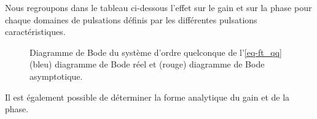 Nous regroupons dans le tableau ci-dessous l'effet sur le gain et sur la phase 
pour chaque domaines de pulsations définis par les différentes pulsations 
caractéristiques.
\begin{table}[!h]
    \centering
\end{table}
\begin{figure}[!t]
    \centering
    

    
    \caption{Diagramme de Bode du système d'ordre quelconque de 
             l'\cref{eq-ft_qq} (bleu) diagramme de Bode réel et (rouge) 
             diagramme de Bode asymptotique.\label{fig-bode_qq}}
\end{figure}
Il est également possible de déterminer la forme analytique du gain et 
de la phase.
